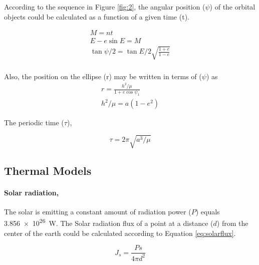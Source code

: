 \documentclass[11pt]{article}
\begin{document}
According to the sequence in Figure \ref{fig:2}, the angular position ($\psi$) of the orbital objects could be calculated as a function of a given time (t).

\begin{gather}\label{eq:12}
    M = n t \\
    E-e\sin{E} = M \\
    \tan{\psi/2} = \tan{E/2}\sqrt{\frac{1+e}{1-e}} \\
\end{gather}

Also, the position on the ellipse (r) may be written in terms of ($\psi$) as
\begin{gather}\label{eq:14}
    r = \frac{h^2/\mu}{1+e\cos{\psi_1}}\\
    h^2/\mu = a(1-e^2)
\end{gather}

The periodic time ($\tau$),
 
\begin{equation}
    \tau = 2\pi\sqrt{a^3/\mu}
\end{equation}



\subsection{Thermal Models}

\paragraph{Solar radiation,} The solar is emitting a constant amount of radiation power ($P$) equals \SI{3.856e26}{\watt}. The Solar radiation flux of a point at a distance ($d$) from the center of the earth could be calculated according to Equation \ref{eq:solarflux}.

\begin{equation} \label{eq:solarflux}
    J_s = \frac{Ps}{4\pi d^2}
\end{equation}
\end{document}
